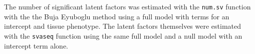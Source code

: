 

The number of significant latent factors was estimated with the \verb|num.sv| function with the the Buja Eyuboglu method using a full model with terms for an intercept and tissue phenotype.
The latent factors themselves were estimated with the \verb|svaseq| function using the same full model and a null model with an intercept term alone.
